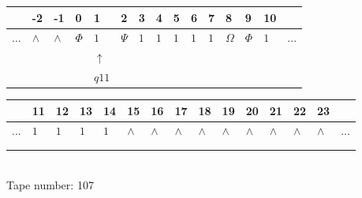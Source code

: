 \documentclass[11pt]{article}
\begin{document}
\begin{table}[H]
\centering
\begin{tabular}{lllllllllllllll}
 & -2 & -1 & 0 & 1 & 2 & 3 & 4 & 5 & 6 & 7 & 8 & 9 & 10 & \\
\hline
$...$ & \multicolumn{1}{|l|}{$\wedge$} & \multicolumn{1}{|l|}{$\wedge$} & \multicolumn{1}{|l|}{$\Phi$} & \multicolumn{1}{|l|}{$1$} & \multicolumn{1}{|l|}{$\Psi$} & \multicolumn{1}{|l|}{$1$} & \multicolumn{1}{|l|}{$1$} & \multicolumn{1}{|l|}{$1$} & \multicolumn{1}{|l|}{$1$} & \multicolumn{1}{|l|}{$1$} & \multicolumn{1}{|l|}{$\Omega$} & \multicolumn{1}{|l|}{$\Phi$} & \multicolumn{1}{|l|}{$1$} & $...$\\
\hline
&  &  &  & $\uparrow$ &  &  &  &  &  &  &  &  &  &  \\
&  &  &  & $ q11 $ &  &  &  &  &  &  &  &  &  &  \\
\end{tabular}
\begin{tabular}{lllllllllllllll}
 & 11 & 12 & 13 & 14 & 15 & 16 & 17 & 18 & 19 & 20 & 21 & 22 & 23 & \\
\hline
$...$ & \multicolumn{1}{|l|}{$1$} & \multicolumn{1}{|l|}{$1$} & \multicolumn{1}{|l|}{$1$} & \multicolumn{1}{|l|}{$1$} & \multicolumn{1}{|l|}{$\wedge$} & \multicolumn{1}{|l|}{$\wedge$} & \multicolumn{1}{|l|}{$\wedge$} & \multicolumn{1}{|l|}{$\wedge$} & \multicolumn{1}{|l|}{$\wedge$} & \multicolumn{1}{|l|}{$\wedge$} & \multicolumn{1}{|l|}{$\wedge$} & \multicolumn{1}{|l|}{$\wedge$} & \multicolumn{1}{|l|}{$\wedge$} & $...$\\
\hline
&  &  &  &  &  &  &  &  &  &  &  &  &  &  \\
&  &  &  &  &  &  &  &  &  &  &  &  &  &  \\
\end{tabular}
\\
Tape number: 107
\noindent\makebox[\linewidth]{\hdashrule{\textwidth}{1pt}{1pt}}\end{table}
\clearpage
\end{document}
